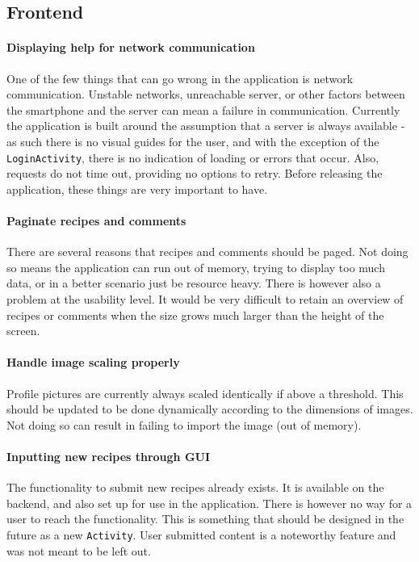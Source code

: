 \subsection{Frontend}

\paragraph{Displaying help for network communication}
One of the few things that can go wrong in the application is network communication. Unstable networks, unreachable server, or other factors between the smartphone and the server can mean a failure in communication. Currently the application is built around the assumption that a server is always available - as such there is no visual guides for the user, and with the exception of the \texttt{LoginActivity}, there is no indication of loading or errors that occur. Also, requests do not time out, providing no options to retry. Before releasing the application, these things are very important to have.

\paragraph{Paginate recipes and comments}
There are several reasons that recipes and comments should be paged. Not doing so means the application can run out of memory, trying to display too much data, or in a better scenario just be resource heavy. There is however also a problem at the usability level. It would be very difficult to retain an overview of recipes or comments when the size grows much larger than the height of the screen. 

\paragraph{Handle image scaling properly}
Profile pictures are currently always scaled identically if above a threshold. This should be updated to be done dynamically according to the dimensions of images. Not doing so can result in failing to import the image (out of memory).

\paragraph{Inputting new recipes through GUI}
The functionality to submit new recipes already exists. It is available on the backend, and also set up for use in the application. There is however no way for a user to reach the functionality. This is something that should be designed in the future as a new \texttt{Activity}. User submitted content is a noteworthy feature and was not meant to be left out.

